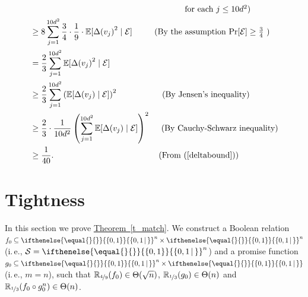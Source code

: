 \documentclass[11pt]{article}
\numberwithin{equation}{section}
\theoremstyle{definition}
\theoremstyle{plain}
\newcommand{\R}{\mathbb R}
\newcommand{\ie}{i.\,e.}
\newcommand{\expref}[2]{\hyperref[#2]{#1~\ref{#2}}}
\newcommand{\md}{\middle}
\newcommand{\dr}{\nicefrac}
\newcommand{\sq}{\sqrt}
\newcommand{\set}[2][]{\ifthenelse{\equal{}{#1}}%
{\ensuremath{\left\{#2\right\}}}%
{\ensuremath{\left\{#2\,\md|\,#1\right\}}}}
\newcommand{\asT}[1]{\Theta(#1)}
\newcommand{\OI}{\set{0,1}}
\newcommand{\sbseq}{\subseteq}
\newcommand{\clE}{\mathcal{E}}
\newcommand{\E}{\mathbb{E}}
\begin{document}
\begin{align}
&\mbox{\ \ \ \ \ \ \ \ \ \ \ \ \ \ \ \ \ \ \ \ \  \ \ \ \ \ \ \ \ \ \ \ \ \ \ \ \ \ \ \ \ \ \  \  \ \ \ \ \ \ \ \ \ \ \ \ for each $j \leq 10d^2$)} \nonumber \\
&\geq 8 \sum_{j=1}^{10d^2} \frac{3}{4} \cdot \frac{1}{9} \cdot \E[{\Delta(v_j)}^2 \mid \clE] \mbox{\ \ \ \ \ \  \ \  (By the assumption $\Pr[\clE] \geq \frac{3}{4}$ )} \nonumber \\
&= \frac{2}{3}\sum_{j=1}^{10d^2}   \E[{\Delta(v_j)}^2 \mid \clE]  \nonumber \\
&\geq \frac{2}{3}\sum_{j=1}^{10d^2}   \left(\E[{\Delta(v_j)} \mid \clE]\right)^2 \mbox{\ \ \ \ \ \ \ \ \ \ \ \ \ \ \ \ (By Jensen's inequality)} \nonumber \\
&\geq \frac{2}{3} \cdot \frac{1}{10d^2} \left(\sum_{j=1}^{10d^2}  \E[\Delta(v_j) \mid \clE]\right)^2 \mbox{\ \ \ \ (By Cauchy-Schwarz inequality)} \nonumber \\
&\geq \frac{1}{40}.\mbox{\ \ \ \ \ \ \ \ \ \ \ \ \ \ \ \ \ \ \ \ \ \ \ \ \ \ \ \ \ \ \ \ \ \ \  \ \ \ (From~(\ref{deltabound}))}\label{infbound}
\end{align}


%
%


\section{Tightness}


In this section we prove \expref{Theorem}{t_match}. We construct a
Boolean  %
relation $f_0\sbseq\OI^n\times\OI^n$ (\ie, $\mathcal{S}=\OI^n$) and a promise function $g_0 \subseteq \OI^n\times\set{0,1}$ (\ie, $m=n$), such that $\R_{\dr49}(f_0)\in\asT{\sq n}$, $\R_{\dr13}(g_0)\in\asT{n}$ and $\R_{\dr13}(f_0\circ g_0^n)\in\asT{n}$.
\end{document}
